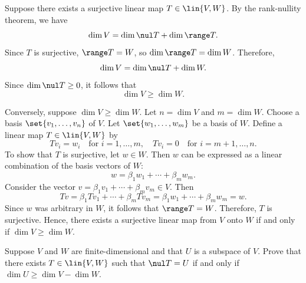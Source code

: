 \begin{sol}
    Suppose there exists a surjective linear map $T \in \lin{V, W}$. By the rank-nullity theorem, we have
    \[\dim V = \dim \nul T + \dim \range T.\]
    Since $T$ is surjective, $\range T = W$, so $\dim \range T = \dim W$. Therefore,
    \[\dim V = \dim \nul T + \dim W.\]
    Since $\dim \nul T \geq 0$, it follows that
    \[\dim V \geq \dim W.\]

    Conversely, suppose $\dim V \geq \dim W$. Let $n = \dim V$ and $m = \dim W$. Choose a basis $\set{v_1, \ldots, v_n}$ of $V$. Let $\set{w_1, \ldots, w_m}$ be a basis of $W$. Define a linear map $T \in \lin{V, W}$ by
    \[Tv_i = w_i \quad \text{for } i = 1, \ldots, m, \quad Tv_i = 0 \quad \text{for } i = m + 1, \ldots, n.\]
    To show that $T$ is surjective, let $w \in W$. Then $w$ can be expressed as a linear combination of the basis vectors of $W$:
    \[w = \beta_1 w_1 + \cdots + \beta_m w_m.\]
    Consider the vector $v = \beta_1 v_1 + \cdots + \beta_m v_m \in V$. Then
    \[Tv = \beta_1 Tv_1 + \cdots + \beta_m Tv_m = \beta_1 w_1 + \cdots + \beta_m w_m = w.\]
    Since $w$ was arbitrary in $W$, it follows that $\range T = W$. Therefore, $T$ is surjective. Hence, there exists a surjective linear map from $V$ onto $W$ if and only if $\dim V \geq \dim W$.
\end{sol}

\begin{exercise}[3b18]
    Suppose $V$ and $W$ are finite-dimensional and that $U$ is a subspace of $V$. Prove that there exists $T \in \lin{V, W}$ such that $\nul T = U$ if and only if $\dim U \geq \dim V - \dim W$.
\end{exercise}

